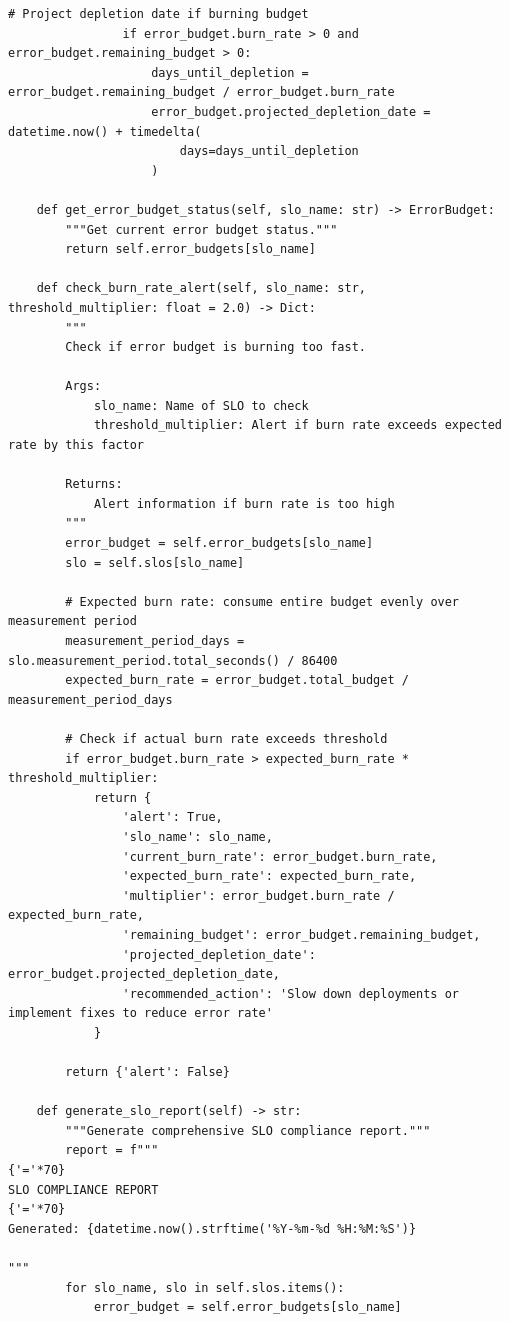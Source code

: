 \begin{lstlisting}[style=python, caption={SLIs and SLOs for ML systems}]
                # Project depletion date if burning budget
                if error_budget.burn_rate > 0 and error_budget.remaining_budget > 0:
                    days_until_depletion = error_budget.remaining_budget / error_budget.burn_rate
                    error_budget.projected_depletion_date = datetime.now() + timedelta(
                        days=days_until_depletion
                    )

    def get_error_budget_status(self, slo_name: str) -> ErrorBudget:
        """Get current error budget status."""
        return self.error_budgets[slo_name]

    def check_burn_rate_alert(self, slo_name: str, threshold_multiplier: float = 2.0) -> Dict:
        """
        Check if error budget is burning too fast.

        Args:
            slo_name: Name of SLO to check
            threshold_multiplier: Alert if burn rate exceeds expected rate by this factor

        Returns:
            Alert information if burn rate is too high
        """
        error_budget = self.error_budgets[slo_name]
        slo = self.slos[slo_name]

        # Expected burn rate: consume entire budget evenly over measurement period
        measurement_period_days = slo.measurement_period.total_seconds() / 86400
        expected_burn_rate = error_budget.total_budget / measurement_period_days

        # Check if actual burn rate exceeds threshold
        if error_budget.burn_rate > expected_burn_rate * threshold_multiplier:
            return {
                'alert': True,
                'slo_name': slo_name,
                'current_burn_rate': error_budget.burn_rate,
                'expected_burn_rate': expected_burn_rate,
                'multiplier': error_budget.burn_rate / expected_burn_rate,
                'remaining_budget': error_budget.remaining_budget,
                'projected_depletion_date': error_budget.projected_depletion_date,
                'recommended_action': 'Slow down deployments or implement fixes to reduce error rate'
            }

        return {'alert': False}

    def generate_slo_report(self) -> str:
        """Generate comprehensive SLO compliance report."""
        report = f"""
{'='*70}
SLO COMPLIANCE REPORT
{'='*70}
Generated: {datetime.now().strftime('%Y-%m-%d %H:%M:%S')}

"""
        for slo_name, slo in self.slos.items():
            error_budget = self.error_budgets[slo_name]


\end{lstlisting}
